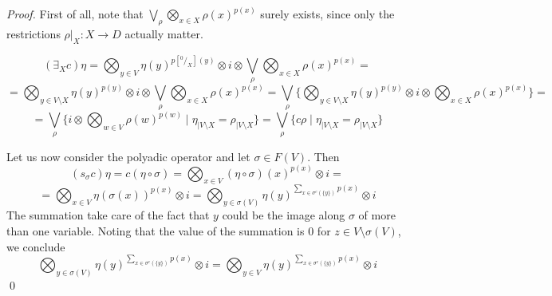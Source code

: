 \documentclass{llncs}
\begin{document}
\begin{proof}
First of all, note that $\bigvee_{\rho} \bigotimes_{x \in X} \rho(x)^{p(x)}$ surely exists, 
since only the restrictions $\rho|_X: X \rightarrow D$ actually matter.


\[(\exists_X c)\eta 
   = \bigotimes_{y \in V} \eta(y)^{p[^0/_X](y)} \otimes i \otimes \bigvee_{\rho} \bigotimes_{x \in X} \rho(x)^{p(x)} = \]
\[ = \bigotimes_{y \in V \setminus X} \eta(y)^{p(y)} \otimes i \otimes \bigvee_{\rho} \bigotimes_{x \in X} \rho(x)^{p(x)}
   = \bigvee_\rho \{ \bigotimes_{y \in V \setminus X} \eta(y)^{p(y)} \otimes i \otimes \bigotimes_{x \in X} \rho(x)^{p(x)}\} = \]
\[ =  \bigvee_\rho \{ i \otimes \bigotimes_{w \in V} \rho(w)^{p(w)}  \mid \eta_{\mid V \setminus X} = \rho_{\mid V \setminus X} \}
   = \bigvee_\rho \{ c \rho \mid \eta_{\mid V \setminus X} = \rho_{\mid V \setminus X} \} \]

Let us now consider the polyadic operator and let $\sigma\in F(V)$. Then
\[ (s_\sigma c)\eta = c (\eta \circ \sigma) = \bigotimes_{x \in V} (\eta \circ \sigma)(x)^{p(x)} \otimes i = \]
\[ = \bigotimes_{x \in V} \eta(\sigma(x))^{p(x)} \otimes i = \bigotimes_{y \in \sigma(V)} \eta(y)^{\sum_{x \in \sigma^c(\{y\})} p(x)} \otimes i\]
The summation take care of the fact that $y$ could be the image along $\sigma$ of more than one variable. 
Noting that the value of the summation is $0$ for $z \in V \setminus \sigma(V)$, we conclude
\[ \bigotimes_{y \in \sigma(V)} \eta(y)^{\sum_{x \in \sigma^c(\{y\})} p(x)} \otimes i = \bigotimes_{y \in V} \eta(y)^{\sum_{x \in \sigma^c(\{y\})} p(x)} \otimes i\]
%
\qed
\end{proof}
\end{document}
